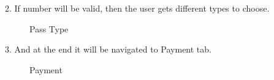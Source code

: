 \documentclass[12pt]{report}
\begin{document}
2.	If number will be valid, then the user gets different types to choose.
\begin{figure}[H]
	\caption{\label{fig:passtype}Pass Type}	
\end{figure}


3.	And at the end it will be navigated to Payment tab.
\begin{figure}[H]
	\caption{\label{fig:payment}Payment}	
\end{figure}
\end{document}
